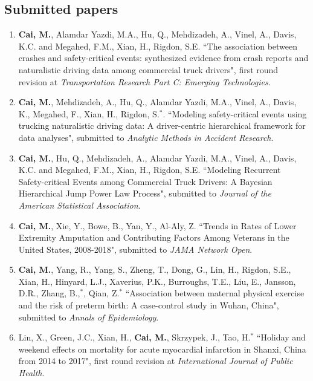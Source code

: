 \documentclass[11pt, a4paper]{article}
\begin{document}
	\subsection*{Submitted papers}
	\begin{enumerate}[leftmargin=0ex,itemsep=1ex]
		\item \textbf{Cai, M.}, Alamdar Yazdi, M.A., Hu, Q., Mehdizadeh, A., Vinel, A., Davis, K.C. and Megahed, F.M., Xian, H., Rigdon, S.E. ``The association between crashes and safety-critical events: synthesized evidence from crash reports and naturalistic driving data among commercial truck drivers", first round revision at \emph{Transportation Research Part C: Emerging Technologies}.
		
		\item \textbf{Cai, M.}, Mehdizadeh, A., Hu, Q., Alamdar Yazdi, M.A., Vinel, A., Davis, K., Megahed, F., Xian, H., Rigdon, S.$^\ast$. ``Modeling safety-critical events using trucking naturalistic driving data: A driver-centric hierarchical framework for data analyses", submitted to \emph{Analytic Methods in Accident Research}.
		
		\item \textbf{Cai, M.}, Hu, Q., Mehdizadeh, A., Alamdar Yazdi, M.A., Vinel, A., Davis, K.C. and Megahed, F.M., Xian, H., Rigdon, S.E. ``Modeling Recurrent Safety-critical Events among Commercial Truck Drivers: A Bayesian Hierarchical Jump Power Law Process", submitted to \emph{Journal of the American Statistical Association}.
		
		\item \textbf{Cai, M.}, Xie, Y., Bowe, B., Yan, Y., Al-Aly, Z. ``Trends in Rates of Lower Extremity Amputation and Contributing Factors Among Veterans in the United States, 2008-2018", submitted to \emph{JAMA Network Open}.
		
		\item \textbf{Cai, M.}, Yang, R., Yang, S., Zheng, T., Dong, G., Lin, H., Rigdon, S.E., Xian, H., Hinyard, L.J., Xaverius, P.K., Burroughs, T.E., Liu, E., Jansson, D.R., Zhang, B.,$^\ast$, Qian, Z.$^\ast$ ``Association between maternal physical exercise and the risk of preterm birth: A case-control study in Wuhan, China", submitted to \emph{Annals of Epidemiology}.
		
		\item Lin, X., Green, J.C., Xian, H., \textbf{Cai, M.}, Skrzypek, J., Tao, H.$^\ast$ ``Holiday and weekend effects on mortality for acute myocardial infarction in Shanxi, China from 2014 to 2017", first round revision at \emph{International Journal of Public Health}.
	\end{enumerate}
	
\end{document}
